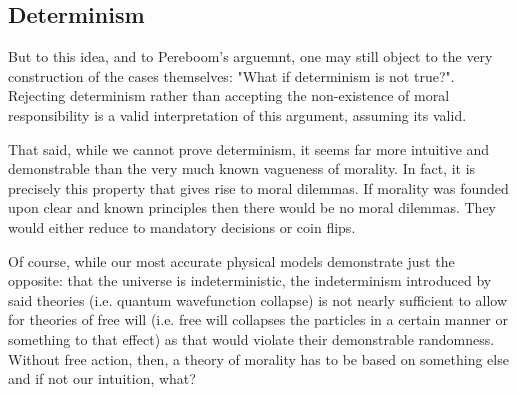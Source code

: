 \documentclass{article}
\begin{document}
\subsection{Determinism}
But to this idea, and to Pereboom's arguemnt, one may still object to the very construction of the cases themselves: "What if determinism is not true?". Rejecting determinism rather than accepting the non-existence of moral responsibility is a valid interpretation of this argument, assuming its valid.

That said, while we cannot prove determinism, it seems far more intuitive and demonstrable than the very much known vagueness of morality. In fact, it is precisely this property that gives rise to moral dilemmas. If morality was founded upon clear and known principles then there would be no moral dilemmas. They would either reduce to mandatory decisions or coin flips.

Of course, while our most accurate physical models demonstrate just the opposite: that the universe is indeterministic, the indeterminism introduced by said theories (i.e. quantum wavefunction collapse) is not nearly sufficient to allow for theories of free will (i.e. free will collapses the particles in a certain manner or something to that effect) as that would violate their demonstrable randomness. Without free action, then, a theory of morality has to be based on something else and if not our intuition, what?

%
\end{document}

